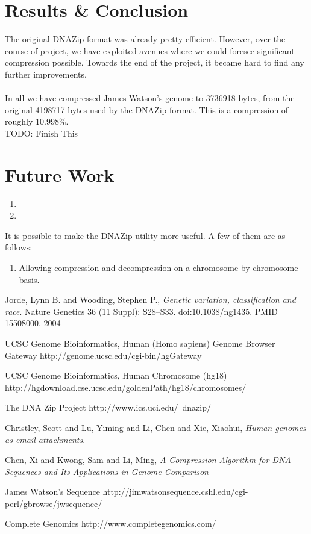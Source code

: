 \documentclass{article}
\begin{document}
\section {Results \& Conclusion}
The original DNAZip format was already pretty efficient. However, over the course of project, we have exploited avenues where we could foresee significant compression possible. Towards the end of the project, it became hard to find any further improvements.\\
\\
In all we have compressed James Watson's genome to 3736918 bytes, from the original 4198717 bytes used by the DNAZip format. This is a compression of roughly 10.998\%. \\

TODO: Finish This
\clearpage

\section {Future Work}

\begin{enumerate}
\item 
\item 

\end{enumerate}

It is possible to make the DNAZip utility more useful. A few of them are as follows:

\begin{enumerate}
\item Allowing compression and decompression on a chromosome-by-chromosome basis.
\end{enumerate}

\clearpage

\begin{thebibliography}{}

  Jorde, Lynn B. and Wooding, Stephen P.,
  \emph{Genetic variation, classification and race}.
  Nature Genetics 36 (11 Suppl): S28–S33. doi:10.1038/ng1435. PMID 15508000,
  2004

  UCSC Genome Bioinformatics, Human (Homo sapiens) Genome Browser Gateway
  http://genome.ucsc.edu/cgi-bin/hgGateway

  UCSC Genome Bioinformatics, Human Chromosome (hg18)
  http://hgdownload.cse.ucsc.edu/goldenPath/hg18/chromosomes/

  The DNA Zip Project
  http://www.ics.uci.edu/~dnazip/

  Christley, Scott and Lu, Yiming and Li, Chen and Xie, Xiaohui,
  \emph{Human genomes as email attachments}.

  Chen, Xi and Kwong, Sam and Li, Ming,
  \emph{A Compression Algorithm for DNA Sequences and Its Applications in Genome Comparison}
 
  James Watson's Sequence
  http://jimwatsonsequence.cshl.edu/cgi-perl/gbrowse/jwsequence/

  Complete Genomics
  http://www.completegenomics.com/ 
\end{thebibliography}
\end{document}
